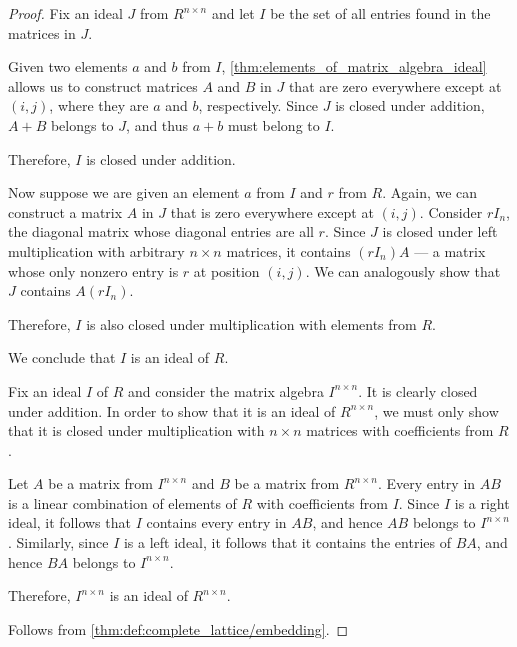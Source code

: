 \begin{proof}
   Fix an ideal \( J \) from \( R^{n \times n} \) and let \( I \) be the set of all entries found in the matrices in \( J \).

  Given two elements \( a \) and \( b \) from \( I \), \cref{thm:elements_of_matrix_algebra_ideal} allows us to construct matrices \( A \) and \( B \) in \( J \) that are zero everywhere except at \( (i, j) \), where they are \( a \) and \( b \), respectively. Since \( J \) is closed under addition, \( A + B \) belongs to \( J \), and thus \( a + b \) must belong to \( I \).

  Therefore, \( I \) is closed under addition.

  Now suppose we are given an element \( a \) from \( I \) and \( r \) from \( R \). Again, we can construct a matrix \( A \) in \( J \) that is zero everywhere except at \( (i, j) \). Consider \( r I_n \), the diagonal matrix whose diagonal entries are all \( r \). Since \( J \) is closed under left multiplication with arbitrary \( n \times n \) matrices, it contains \( (r I_n) A \) --- a matrix whose only nonzero entry is \( r \) at position \( (i, j) \). We can analogously show that \( J \) contains \( A (r I_n) \).

  Therefore, \( I \) is also closed under multiplication with elements from \( R \).

  We conclude that \( I \) is an ideal of \( R \).

   Fix an ideal \( I \) of \( R \) and consider the matrix algebra \( I^{n \times n} \). It is clearly closed under addition. In order to show that it is an ideal of \( R^{n \times n} \), we must only show that it is closed under multiplication with \( n \times n \) matrices with coefficients from \( R \).

  Let \( A \) be a matrix from \( I^{n \times n} \) and \( B \) be a matrix from \( R^{n \times n} \). Every entry in \( AB \) is a linear combination of elements of \( R \) with coefficients from \( I \). Since \( I \) is a right ideal, it follows that \( I \) contains every entry in \( AB \), and hence \( AB \) belongs to \( I^{n \times n} \). Similarly, since \( I \) is a left ideal, it follows that it contains the entries of \( BA \), and hence \( BA \) belongs to \( I^{n \times n} \).

  Therefore, \( I^{n \times n} \) is an ideal of \( R^{n \times n} \).

   Follows from \cref{thm:def:complete_lattice/embedding}.
\end{proof}


